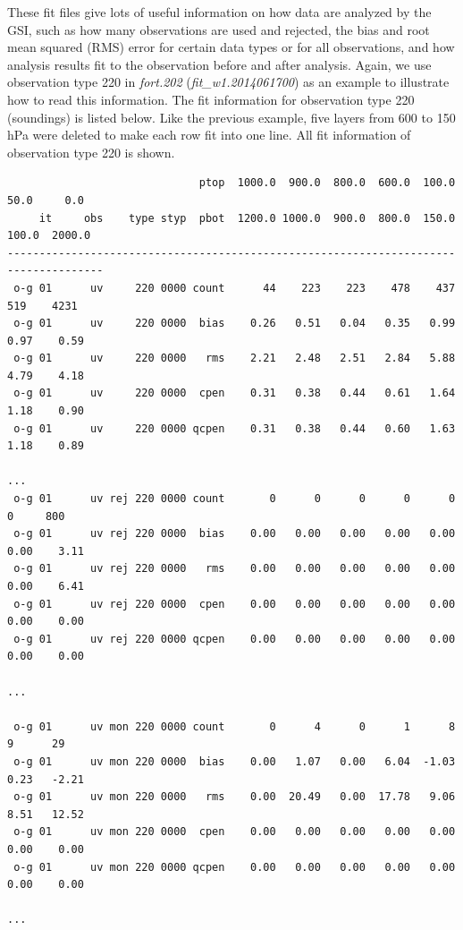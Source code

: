 These fit files give lots of useful information on how data are analyzed by the GSI, such as how many observations are used and rejected, the bias and root mean squared (RMS) error for certain data types or for all observations, and how analysis results fit to the observation before and after analysis. Again, we use observation type 220 in \textit{fort.202} (\textit{fit\_w1.2014061700}) as an example to illustrate how to read this information. The fit information for observation type 220 (soundings) is listed below. Like the previous example, five layers from 600 to 150 hPa were deleted to make each row fit into one line. All fit information of observation type 220 is shown. 

\begin{scriptsize}
\begin{verbatim}
                              ptop  1000.0  900.0  800.0  600.0  100.0   50.0     0.0
     it     obs    type styp  pbot  1200.0 1000.0  900.0  800.0  150.0  100.0  2000.0
-------------------------------------------------------------------------------------
 o-g 01      uv     220 0000 count      44    223    223    478    437    519    4231
 o-g 01      uv     220 0000  bias    0.26   0.51   0.04   0.35   0.99   0.97    0.59
 o-g 01      uv     220 0000   rms    2.21   2.48   2.51   2.84   5.88   4.79    4.18
 o-g 01      uv     220 0000  cpen    0.31   0.38   0.44   0.61   1.64   1.18    0.90
 o-g 01      uv     220 0000 qcpen    0.31   0.38   0.44   0.60   1.63   1.18    0.89

...
 o-g 01      uv rej 220 0000 count       0      0      0      0      0      0     800
 o-g 01      uv rej 220 0000  bias    0.00   0.00   0.00   0.00   0.00   0.00    3.11
 o-g 01      uv rej 220 0000   rms    0.00   0.00   0.00   0.00   0.00   0.00    6.41
 o-g 01      uv rej 220 0000  cpen    0.00   0.00   0.00   0.00   0.00   0.00    0.00
 o-g 01      uv rej 220 0000 qcpen    0.00   0.00   0.00   0.00   0.00   0.00    0.00

...

 o-g 01      uv mon 220 0000 count       0      4      0      1      8      9      29
 o-g 01      uv mon 220 0000  bias    0.00   1.07   0.00   6.04  -1.03   0.23   -2.21
 o-g 01      uv mon 220 0000   rms    0.00  20.49   0.00  17.78   9.06   8.51   12.52
 o-g 01      uv mon 220 0000  cpen    0.00   0.00   0.00   0.00   0.00   0.00    0.00
 o-g 01      uv mon 220 0000 qcpen    0.00   0.00   0.00   0.00   0.00   0.00    0.00

...


\end{verbatim}
\end{scriptsize}
